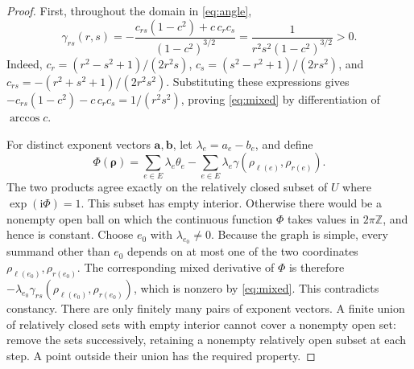 \documentclass[a4paper,11pt]{amsart}
\theoremstyle{remark}
\newcommand{\ii}{\mathrm i}
\begin{document}
\begin{proof}
First, throughout the domain in \eqref{eq:angle},
\begin{equation}\label{eq:mixed}
 \gamma_{rs}(r,s)
 =-\frac{c_{rs}(1-c^2)+c\,c_r c_s}{(1-c^2)^{3/2}}
 =\frac{1}{r^2s^2(1-c^2)^{3/2}}>0.
\end{equation}
Indeed,
$c_r=(r^2-s^2+1)/(2r^2s)$,
$c_s=(s^2-r^2+1)/(2rs^2)$, and
$c_{rs}=-(r^2+s^2+1)/(2r^2s^2)$.
Substituting these expressions gives
$-c_{rs}(1-c^2)-c\,c_r c_s=1/(r^2s^2)$, proving
\eqref{eq:mixed} by differentiation of $\arccos c$.

For distinct exponent vectors $\mathbf a,\mathbf b$, let
$\lambda_e=a_e-b_e$, and define
\[
 \Phi(\boldsymbol\rho)
 =\sum_{e\in E}\lambda_e\theta_e
  -\sum_{e\in E}\lambda_e
       \gamma(\rho_{\ell(e)},\rho_{r(e)}).
\]
The two products agree exactly on the relatively closed subset of $U$
where $\exp(\ii\Phi)=1$.
This subset has empty interior. Otherwise there would be a nonempty
open ball on which the continuous function $\Phi$ takes values in
$2\pi\mathbb Z$, and hence is constant. Choose $e_0$ with
$\lambda_{e_0}\ne0$. Because the graph is simple, every summand other
than $e_0$ depends on at most one of the two coordinates
$\rho_{\ell(e_0)},\rho_{r(e_0)}$.
The corresponding mixed derivative of $\Phi$ is therefore
$-\lambda_{e_0}\gamma_{rs}
 (\rho_{\ell(e_0)},\rho_{r(e_0)})$, which is nonzero by
\eqref{eq:mixed}. This contradicts constancy.
There are only finitely many pairs of exponent vectors.
A finite union of relatively closed sets with empty interior cannot
cover a nonempty open set: remove the sets successively, retaining a
nonempty relatively open subset at each step.
A point outside their union has the required property.
\end{proof}
\end{document}
